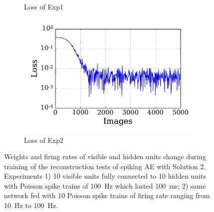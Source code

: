 \begin{figure}
\begin{subfigure}[t]{0.48\textwidth}
		\caption{Loss of Exp1}
	\end{subfigure}
	\begin{subfigure}[t]{0.48\textwidth}
		\includegraphics[width=\textwidth]{pics_sdlm/03_exp_SAE_noise_long/exp2_mse_nons.pdf}
		\caption{Loss of Exp2}
	\end{subfigure}
	\caption[SAE-S2 training of the reconstruction tests.]{Weights and firing rates of visible and hidden units change during training of the reconstruction tests of spiking AE with Solution 2. 
		Experiments 1) 10 visible units fully connected to 10 hidden units with Poisson spike trains of 100~Hz which lasted 100~ms; 2) same network fed with 10 Poisson spike trains of firing rate ranging from 10~Hz to 100~Hz.}
	\label{fig:sol2_ae}
\end{figure}

